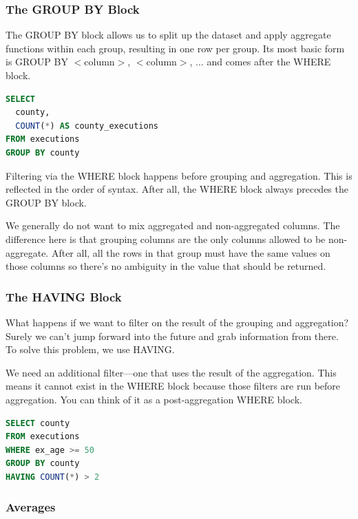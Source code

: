 \documentclass{article}
\begin{document}
\subsubsection{The GROUP BY Block}

The GROUP BY block allows us to split up the dataset and apply aggregate functions within each group, resulting in one row per group. Its most basic form is GROUP BY $<$column$>$, $<$column$>$, ... and comes after the WHERE block.

\vspace{8pt} \begin{lstlisting}[language=SQL]
SELECT
  county,
  COUNT(*) AS county_executions
FROM executions
GROUP BY county
\end{lstlisting} \vspace{8pt}

Filtering via the WHERE block happens before grouping and aggregation. This is reflected in the order of syntax. After all, the WHERE block always precedes the GROUP BY block.

We generally do not want to mix aggregated and non-aggregated columns. The difference here is that grouping columns are the only columns allowed to be non-aggregate. After all, all the rows in that group must have the same values on those columns so there’s no ambiguity in the value that should be returned.

\subsubsection{The HAVING Block }

What happens if we want to filter on the result of the grouping and aggregation? Surely we can’t jump forward into the future and grab information from there. To solve this problem, we use HAVING.

We need an additional filter—one that uses the result of the aggregation. This means it cannot exist in the WHERE block because those filters are run before aggregation. You can think of it as a post-aggregation WHERE block.

\vspace{8pt} \begin{lstlisting}[language=SQL]
SELECT county
FROM executions
WHERE ex_age >= 50
GROUP BY county
HAVING COUNT(*) > 2
\end{lstlisting} \vspace{8pt}

\subsubsection{Averages}
\end{document}
